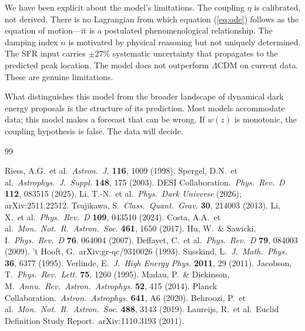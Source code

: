 \documentclass[12pt,a4paper]{article}
\begin{document}
We have been explicit about the model's limitations. The coupling $\eta$ is calibrated, not derived. There is no Lagrangian from which equation (\ref{eq:ode}) follows as the equation of motion---it is a postulated phenomenological relationship. The damping index $n$ is motivated by physical reasoning but not uniquely determined. The SFR input carries $\pm27\%$ systematic uncertainty that propagates to the predicted peak location. The model does not outperform $\Lambda$CDM on current data. These are genuine limitations.

What distinguishes this model from the broader landscape of dynamical dark energy proposals is the structure of its prediction. Most models accommodate data; this model makes a forecast that can be wrong. If $w(z)$ is monotonic, the coupling hypothesis is false. The data will decide.

\begin{thebibliography}{99}

 Riess, A.G.\ et al.\ {\it Astron.\ J.} {\bf 116}, 1009 (1998).
 Spergel, D.N.\ et al.\ {\it Astrophys.\ J.\ Suppl.} {\bf 148}, 175 (2003).
 DESI Collaboration.\ {\it Phys.\ Rev.\ D} {\bf 112}, 083515 (2025).
 Li, T.-N.\ et al.\ {\it Phys.\ Dark Universe} (2026); arXiv:2511.22512.
 Tsujikawa, S.\ {\it Class.\ Quant.\ Grav.} {\bf 30}, 214003 (2013).
 Li, X.\ et al.\ {\it Phys.\ Rev.\ D} {\bf 109}, 043510 (2024).
 Costa, A.A.\ et al.\ {\it Mon.\ Not.\ R.\ Astron.\ Soc.} {\bf 461}, 1650 (2017).
 Hu, W.\ \& Sawicki, I.\ {\it Phys.\ Rev.\ D} {\bf 76}, 064004 (2007).
 Deffayet, C.\ et al.\ {\it Phys.\ Rev.\ D} {\bf 79}, 084003 (2009).
 't Hooft, G.\ arXiv:gr-qc/9310026 (1993).
 Susskind, L.\ {\it J.\ Math.\ Phys.} {\bf 36}, 6377 (1995).
 Verlinde, E.\ {\it J.\ High Energy Phys.} {\bf 2011}, 29 (2011).
 Jacobson, T.\ {\it Phys.\ Rev.\ Lett.} {\bf 75}, 1260 (1995).
 Madau, P.\ \& Dickinson, M.\ {\it Annu.\ Rev.\ Astron.\ Astrophys.} {\bf 52}, 415 (2014).
 Planck Collaboration.\ {\it Astron.\ Astrophys.} {\bf 641}, A6 (2020).
 Behroozi, P.\ et al.\ {\it Mon.\ Not.\ R.\ Astron.\ Soc.} {\bf 488}, 3143 (2019).
 Laureijs, R.\ et al.\ Euclid Definition Study Report.\ arXiv:1110.3193 (2011).

\end{thebibliography}
\end{document}
